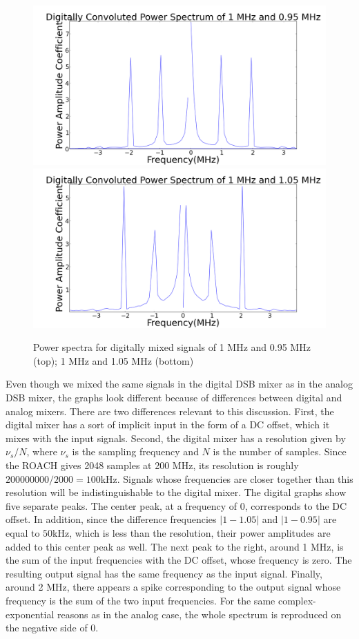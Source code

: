 \documentclass[11pt]{article}
\begin{document}
\begin{figure}
\centering
\includegraphics[scale=0.35]{pictures/digitaloninefive}
\includegraphics[scale=0.35]{pictures/digitaloneofive}
\caption{Power spectra for digitally mixed signals of 1 MHz and 0.95 MHz (top); 1 MHz and 1.05 MHz (bottom) \label{digpow}}
\end{figure}

Even though we mixed the same signals in the digital DSB mixer as in the analog DSB mixer, the graphs look different because of differences between digital and analog mixers. There are two differences relevant to this discussion. First, the digital mixer has a sort of implicit input in the form of a DC offset, which it mixes with the input signals. Second, the digital mixer has a resolution given by $\nu_s / N$, where $\nu_s$ is the sampling frequency and $N$ is the number of samples. Since the ROACH gives 2048 samples at 200 MHz, its resolution is roughly $200000000/2000 = 100$kHz. Signals whose frequencies are closer together than this resolution will be indistinguishable to the digital mixer. The digital graphs show five separate peaks. The center peak, at a frequency of 0, corresponds to the DC offset. In addition, since the difference frequencies $|1 - 1.05|$ and $|1 - 0.95|$ are equal to $50$kHz, which is less than the resolution, their power amplitudes are added to this center peak as well. The next peak to the right, around 1 MHz, is the sum of the input frequencies with the DC offset, whose frequency is zero. The resulting output signal has the same frequency as the input signal. Finally, around 2 MHz, there appears a spike corresponding to the output signal whose frequency is the sum of the two input frequencies. For the same complex-exponential reasons as in the analog case, the whole spectrum is reproduced on the negative side of 0.
\end{document}
